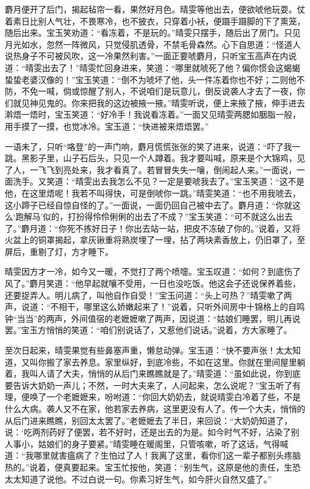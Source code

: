 \documentclass[12pt,oneside]{book}
\begin{document}
麝月便开了后门，揭起毡帘一看，果然好月色。晴雯等他出去，便欲唬他玩耍。仗着素日比别人气壮，不畏寒冷，也不披衣，只穿着小袄，便蹑手蹑脚的下了熏笼，随后出来。宝玉笑劝道：“看冻着，不是玩的。”晴雯只摆手，随后出了房门。只见月光如水，忽然一阵微风，只觉侵肌透骨，不禁毛骨森然。心下自思道：“怪道人说热身子不可被风吹，这一冷果然利害。”一面正要唬麝月，只听宝玉高声在内说道：“晴雯出去了！”晴雯忙回身进来，笑道：“哪里就唬死了他？偏你惯会这蝎蝎蛰蛰老婆汉像的！”宝玉笑道：“倒不为唬坏了他，头一件冻着你也不好；二则他不防，不免一喊，倘或惊醒了别人，不说咱们是玩意儿，倒反说袭人才去了一夜，你们就见神见鬼的。你来把我的这边被掖一掖。”晴雯听说，便上来掖了掖，伸手进去濣焐一焐时，宝玉笑道：“好冷手！我说看冻着。”一面又见晴雯两腮如胭脂一般，用手摸了一摸，也觉冰冷。宝玉道：“快进被来焐焐罢。”

一语未了，只听“咯登”的一声门响，麝月慌慌张张的笑了进来，说道：“吓了我一跳。黑影子里，山子石后头，只见一个人蹲着。我才要叫喊，原来是个大锦鸡，见了人，一飞飞到亮处来，我才看真了。若冒冒失失一嚷，倒闹起人来。”一面说，一面洗手。又笑道：“晴雯出去我怎么不见？一定是要唬我去了。”宝玉笑道：“这不是他，在这里焐呢！我若不叫得快，可是倒唬你一跳。”晴雯笑道：“也不用我唬去，这小蹄子已经自惊自怪的了。”一面说，一面仍回自己被中去了。麝月道：“你就这么‘跑解马’似的，打扮得伶伶俐俐的出去了不成？”宝玉笑道：“可不就这么出去了。”麝月道：“你死不拣好日子！你出去站一站，把皮不冻破了你的。”说着，又将火盆上的铜罩揭起，拿灰锹重将熟炭埋了一埋，拈了两块素香放上，仍旧罩了，至屏后，重剔了灯，方才睡下。

晴雯因方才一冷，如今又一暖，不觉打了两个喷嚏。宝玉叹道：“如何？到底伤了风了。”麝月笑道：“他早起就嚷不受用，一日也没吃饭。他这会子还说保养着些，还要捉弄人。明儿病了，叫他自作自受！”宝玉问道：“头上可热？”晴雯嗽了两声，说道：“不相干，哪里这么娇嫩起来了！”说着，只听外间房中十锦格上的自鸣钟“当当”的两声，外间值宿的老嬷嬷嗽了两声，因说道：“姑娘们睡罢，明儿再说罢。”宝玉方悄悄的笑道：“咱们别说话了，又惹他们说话。”说着，方大家睡了。

至次日起来，晴雯果觉有些鼻塞声重，懒怠动弹。宝玉道：“快不要声张！太太知道，又叫你搬了家去养息。家里纵好，到底冷些，不如在这里。你就在里间屋里躺着，我叫人请了大夫，悄悄的从后门来瞧瞧就是了。”晴雯道：“虽如此说，你到底要告诉大奶奶一声儿；不然，一时大夫来了，人问起来，怎么说呢？”宝玉听了有理，便唤了一个老嬷嬷来，吩咐道：“你回大奶奶去，就说晴雯白冷着了些，不是什么大病。袭人又不在家，他若家去养病，这里更没有人了。传一个大夫，悄悄的从后门进来瞧瞧，别回太太罢了。”老嬷嬷去了半日，来回说：“大奶奶知道了，说：‘吃两剂药好了便罢，若不好时，还是出去的为是。如今时气不好，沾染了别人事小，姑娘们的身子要紧。”晴雯睡在暖阁里，只管咳嗽，听了这话，气得喊道：“我哪里就害瘟病了？生怕过了人！我离了这里，看你们这一辈子都别头疼脑热的。”说着，便真要起来。宝玉忙按他，笑道：“别生气，这原是他的责任，生恐太太知道了说他。不过白说一句。你素习好生气，如今肝火自然又盛了。”
\end{document}
